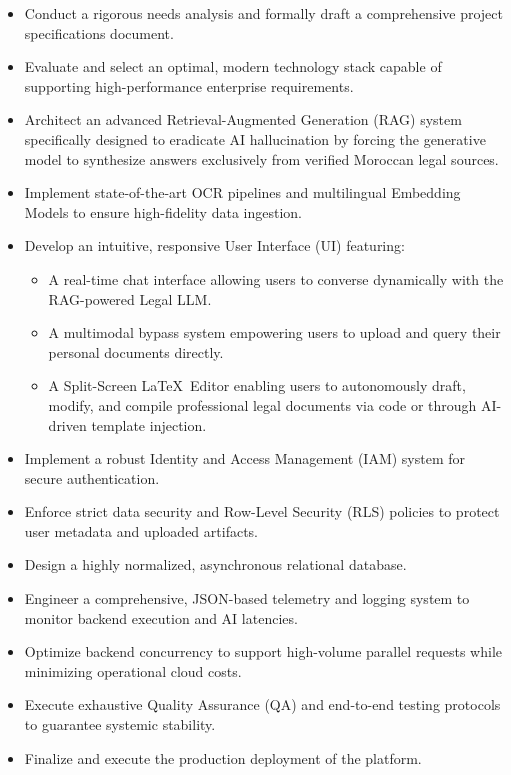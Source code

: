 \begin{itemize}
    \item Conduct a rigorous needs analysis and formally draft a comprehensive project specifications document.
    \item Evaluate and select an optimal, modern technology stack capable of supporting high-performance enterprise requirements.
    \item Architect an advanced Retrieval-Augmented Generation (RAG) system specifically designed to eradicate AI hallucination by forcing the generative model to synthesize answers exclusively from verified Moroccan legal sources.
    \item Implement state-of-the-art OCR pipelines and multilingual Embedding Models to ensure high-fidelity data ingestion.
    \item Develop an intuitive, responsive User Interface (UI) featuring:
    \begin{itemize}
        \item A real-time chat interface allowing users to converse dynamically with the RAG-powered Legal LLM.
        \item A multimodal bypass system empowering users to upload and query their personal documents directly.
        \item A Split-Screen \LaTeX\ Editor enabling users to autonomously draft, modify, and compile professional legal documents via code or through AI-driven template injection.
    \end{itemize}
    \item Implement a robust Identity and Access Management (IAM) system for secure authentication.
    \item Enforce strict data security and Row-Level Security (RLS) policies to protect user metadata and uploaded artifacts.
    \item Design a highly normalized, asynchronous relational database.
    \item Engineer a comprehensive, JSON-based telemetry and logging system to monitor backend execution and AI latencies.
    \item Optimize backend concurrency to support high-volume parallel requests while minimizing operational cloud costs.
    \item Execute exhaustive Quality Assurance (QA) and end-to-end testing protocols to guarantee systemic stability.
    \item Finalize and execute the production deployment of the platform.
\end{itemize}

